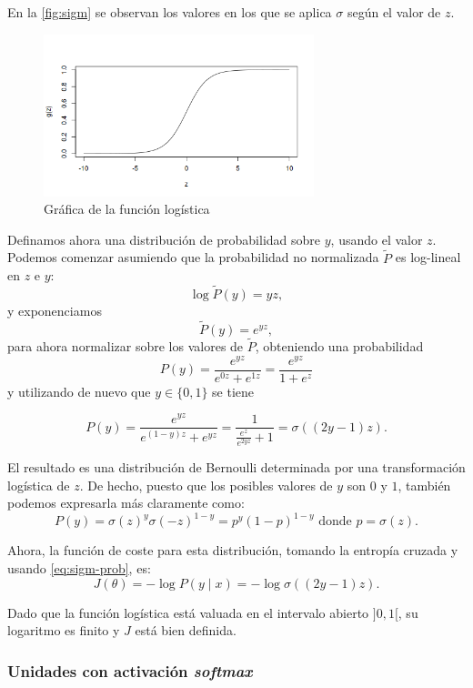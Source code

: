 En la \autoref{fig:sigm} se observan los valores en los que se aplica $\sigma$ según el valor de $z$.

\begin{figure}[hbtp]
  \centering
  \includegraphics[width=0.7\textwidth]{images/sigmoid.png}
  \caption[Logística]{Gráfica de la función logística}
  \label{fig:sigm}
\end{figure}

Definamos ahora una distribución de probabilidad sobre \(y\), usando el
valor \(z\). Podemos comenzar asumiendo que la probabilidad no
normalizada \(\tilde P\) es log-lineal en \(z\) e \(y\):
\[\log \tilde P(y)=yz,\] y exponenciamos \[\tilde P(y)=e^{yz},\] para
ahora normalizar sobre los valores de \(\tilde P\), obteniendo una
probabilidad \[P(y)=\frac{e^{yz}}{e^{0z}+e^{1z}}=\frac{e^{yz}}{1+e^z}\]
y utilizando de nuevo que \(y\in\{0,1\}\) se tiene

\begin{equation}\label{eq:sigm-prob}
  P(y)=\frac{e^{yz}}{e^{(1-y)z}+e^{yz}}=\frac{1}{\frac{e^{z}}{e^{2yz}}+1}=\sigma((2y-1)z).
\end{equation}

El resultado es una distribución de Bernoulli determinada por una
transformación logística de \(z\). De hecho, puesto que los posibles
valores de \(y\) son $0$ y $1$, también podemos expresarla más claramente
como:
\[P(y)=\sigma(z)^y\sigma(-z)^{1-y}=p^y(1-p)^{1-y}\mbox{ donde }p=\sigma(z).\]

Ahora, la función de coste para esta distribución, tomando la entropía
cruzada y usando \eqref{eq:sigm-prob}, es:
\[J(\theta)=-\log P(y\mid x)=-\log\sigma((2y-1)z).\]

Dado que la función logística está valuada en el intervalo abierto
\(]0,1[\), su logaritmo es finito y \(J\) está bien definida.

\subsubsection{\texorpdfstring{Unidades con activación
\emph{softmax}}{Unidades con activación softmax}}\label{unidades-con-activaciuxf3n-softmax}

